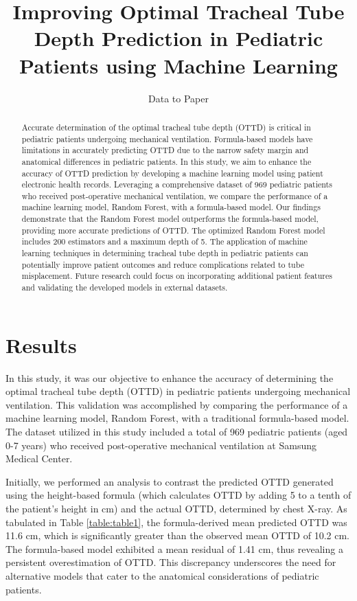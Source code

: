 \documentclass[11pt]{article}
\title{Improving Optimal Tracheal Tube Depth Prediction in Pediatric Patients using Machine Learning}
\author{Data to Paper}
\begin{document}
\maketitle
\begin{abstract}
Accurate determination of the optimal tracheal tube depth (OTTD) is critical in pediatric patients undergoing mechanical ventilation. Formula-based models have limitations in accurately predicting OTTD due to the narrow safety margin and anatomical differences in pediatric patients. In this study, we aim to enhance the accuracy of OTTD prediction by developing a machine learning model using patient electronic health records. Leveraging a comprehensive dataset of 969 pediatric patients who received post-operative mechanical ventilation, we compare the performance of a machine learning model, Random Forest, with a formula-based model. Our findings demonstrate that the Random Forest model outperforms the formula-based model, providing more accurate predictions of OTTD. The optimized Random Forest model includes 200 estimators and a maximum depth of 5. The application of machine learning techniques in determining tracheal tube depth in pediatric patients can potentially improve patient outcomes and reduce complications related to tube misplacement. Future research could focus on incorporating additional patient features and validating the developed models in external datasets.
\end{abstract}
\section*{Results}

In this study, it was our objective to enhance the accuracy of determining the optimal tracheal tube depth (OTTD) in pediatric patients undergoing mechanical ventilation. This validation was accomplished by comparing the performance of a machine learning model, Random Forest, with a traditional formula-based model. The dataset utilized in this study included a total of 969 pediatric patients (aged 0-7 years) who received post-operative mechanical ventilation at Samsung Medical Center. 

Initially, we performed an analysis to contrast the predicted OTTD generated using the height-based formula (which calculates OTTD by adding 5 to a tenth of the patient's height in cm) and the actual OTTD, determined by chest X-ray. As tabulated in Table \ref{table:table1}, the formula-derived mean predicted OTTD was 11.6 cm, which is significantly greater than the observed mean OTTD of 10.2 cm. The formula-based model exhibited a mean residual of 1.41 cm, thus revealing a persistent overestimation of OTTD. This discrepancy underscores the need for alternative models that cater to the anatomical considerations of pediatric patients.
\end{document}
